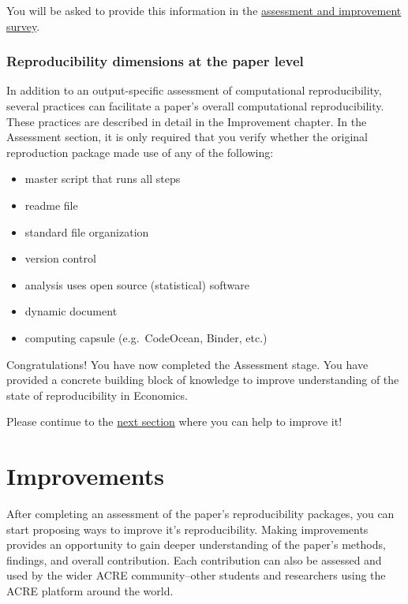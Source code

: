 \documentclass[]{book}
\providecommand{\tightlist}{%
  \setlength{\itemsep}{0pt}\setlength{\parskip}{0pt}}
\begin{document}
You will be asked to provide this information in the \href{ADD\%20LINK}{assessment and improvement survey}.

\hypertarget{reproducibility-dimensions-at-the-paper-level}{%
\subsection{Reproducibility dimensions at the paper level}\label{reproducibility-dimensions-at-the-paper-level}}

In addition to an output-specific assessment of computational reproducibility, several practices can facilitate a paper's overall computational reproducibility. These practices are described in detail in the Improvement chapter. In the Assessment section, it is only required that you verify whether the original reproduction package made use of any of the following:

\begin{itemize}
\tightlist
\item
  master script that runs all steps
\item
  readme file
\item
  standard file organization\\
\item
  version control
\item
  analysis uses open source (statistical) software\\
\item
  dynamic document\\
\item
  computing capsule (e.g.~CodeOcean, Binder, etc.)
\end{itemize}

Congratulations! You have now completed the Assessment stage. You have provided a concrete building block of knowledge to improve understanding of the state of reproducibility in Economics.

Please continue to the \protect\hyperlink{improvements}{next section} where you can help to improve it!

\hypertarget{improvements}{%
\chapter{Improvements}\label{improvements}}

After completing an assessment of the paper's reproducibility packages, you can start proposing ways to improve it's reproducibility. Making improvements provides an opportunity to gain deeper understanding of the paper's methods, findings, and overall contribution. Each contribution can also be assessed and used by the wider ACRE community--other students and researchers using the ACRE platform around the world.
\end{document}
